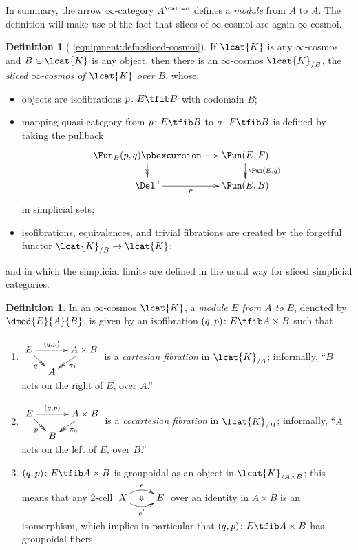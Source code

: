 \documentclass[12pt,reqno]{amsart}
\theoremstyle{plain}
\theoremstyle{definition}
\newtheorem{defn}[thm]{Definition}
\theoremstyle{remark}
\numberwithin{equation}{subsection}
\newcommand{\extRef}[3]{%
  {\protect\IfBeginWith{#3}{itm:}{}{#2.}}\ref*{#1:#3}}
\newcommand{\refV}{\extRef{equipment}{V}}
\begin{document}
In summary, the arrow $\infty$-category $A^\cattwo$ defines a \emph{module} from $A$ to $A$. The definition will make use of the fact that slices of $\infty$-cosmoi are again $\infty$-cosmoi.

\begin{defn}[{\refV{defn:sliced-cosmoi}}]\label{defn:sliced-cosmoi} 
If $\lcat{K}$ is any $\infty$-cosmos and $B \in \lcat{K}$ is any object, then there is an $\infty$-cosmos $\lcat{K}_{/B}$, the \emph{sliced $\infty$-cosmos of $\lcat{K}$ over $B$}, whose:
\begin{itemize}
\item objects are isofibrations $p \colon E \tfib B$ with codomain $B$;
\item mapping quasi-category from $p \colon E \tfib B$ to $q \colon F \tfib B$ is defined by  taking the pullback
\[
    \xymatrix@=1.5em{
      {\Fun_B(p,q)}\pbexcursion\ar[r]\ar@{->>}[d] &
      {\Fun(E,F)}\ar@{->>}[d]^{\Fun(E,q)} \\
      {\Del^0}\ar[r]_-{p} & {\Fun(E,B)}
    }
\]
  in simplicial sets;
\item isofibrations, equivalences, and trivial fibrations are created by the forgetful functor $\lcat{K}_{/B} \to \lcat{K}$;
\end{itemize}
and in which the simplicial limits are defined in the usual way for sliced simplicial categories.
\end{defn}

\begin{defn}\label{defn:module} In an $\infty$-cosmos $\lcat{K}$, a \emph{module $E$ from $A$ to $B$}, denoted by $\dmod{E}{A}{B}$, is given by an isofibration $(q,p) \colon E \tfib A \times B$ such that
  \begin{enumerate}[label=(\roman*)]
\item\label{itm:cartesian-on-the-right} $\vcenter{\xymatrix@=1em{ E \ar@{->>}[dr]_q \ar[rr]^-{(q,p)} & & A \times B \ar@{->>}[dl]^{\pi_1} \\ & A}}$ is a \emph{cartesian fibration} in  $\lcat{K}_{/A}$; informally, ``$B$ acts on the right of $E$, over $A$.'' 
\item\label{itm:cocartesian-on-the-left}  $\vcenter{\xymatrix@=1em{ E \ar@{->>}[dr]_p \ar[rr]^-{(q,p)} & & A \times B \ar@{->>}[dl]^{\pi_0} \\ & B}}$  is a \emph{cocartesian fibration} in $\lcat{K}_{/B}$; informally,  ``$A$ acts on the left of $E$, over $B$.'' 
\item\label{itm:groupoidal-fibers} $(q,p) \colon E \tfib A \times B$ is groupoidal as an object in $\lcat{K}_{/A \times B}$; this  means that any 2-cell $\xymatrix{X \ar@/^2ex/[r]^e \ar@/_2ex/[r]_{e'} \ar@{}[r]|{\Downarrow} & E}$ over an identity in $A \times B$ is an isomorphism, which implies in particular that  $(q,p) \colon E \tfib A \times B$ has groupoidal fibers.
\end{enumerate}
\end{defn}
\end{document}
